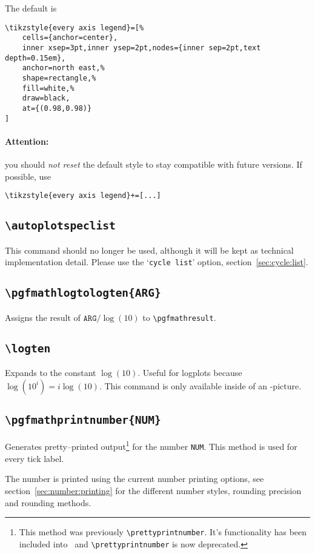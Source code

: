 \noindent
The default is
\begin{lstlisting}
\tikzstyle{every axis legend}=[%
	cells={anchor=center},
	inner xsep=3pt,inner ysep=2pt,nodes={inner sep=2pt,text depth=0.15em},
	anchor=north east,%
	shape=rectangle,%
	fill=white,%
	draw=black,
	at={(0.98,0.98)}
]
\end{lstlisting}
\paragraph{Attention:} you should \emph{not reset} the default style to stay compatible with future versions. If possible, use
\begin{lstlisting}
\tikzstyle{every axis legend}+=[...]
\end{lstlisting}


\subsection{\texttt{\textbackslash autoplotspeclist}}
This command should no longer be used, although it will be kept as technical implementation detail. Please use the `\texttt{cycle list}' option, section~\ref{sec:cycle:list}.

\subsection{\texttt{\textbackslash pgfmathlogtologten\{ARG\}}}
Assigns the result of $\texttt{ARG}/\log(10)$ to \lstinline!\pgfmathresult!.

\subsection{\texttt{\textbackslash logten}}
Expands to the constant $\log(10)$. Useful for logplots because $\log(10^i) = i\log(10)$. This command is only available inside of an \Tikz-picture.

\subsection{\texttt{\textbackslash pgfmathprintnumber\{NUM\}}}
Generates pretty--printed output\footnote{This method was previously \texttt{\textbackslash prettyprintnumber}. It's functionality has been included into \PGF\ and \texttt{\textbackslash prettyprintnumber} is now deprecated.} for the number \texttt{NUM}. This method is used for every tick label.

The number is printed using the current number printing options, see section~\ref{sec:number:printing} for the different number styles, rounding precision and rounding methods.

